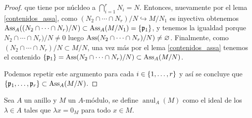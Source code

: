 \documentclass[../main.tex]{subfiles}
\begin{document}
\begin{proof}
que tiene por núcldeo a $\bigcap_{i=1}^r N_i = N$. Entonces, nuevamente por el lema \ref{contenidos_assa}, como $(N_2\cap\cdots\cap N_r)/N\hookrightarrow M/{N_1}$ es inyectiva obtenemos $\text{Ass}_A((N_2\cap\cdots\cap N_r)/N) \subset \text{Ass}_A(M/N_1) = \{\mathfrak{p}_1\}$, y tenemos la igualdad porque $N_2\cap\cdots\cap N_r)/N \neq 0$ luego $\text{Ass}(N_2\cap\cdots\cap N_r)/N) \neq \varnothing$.
Finalmente, como $(N_2\cap\cdots\cap N_r)/N \subset M/N$, una vez más por el lema \ref{contenidos_assa} tenemos el contenido  $\{\mathfrak{p}_1\}= \text{Ass}(N_2\cap\cdots\cap N_r)/N) \subset\text{Ass}_A(M/N)$.

Podemos repetir este argumento para cada $i\in\{1,\dots,r\}$ y así se concluye que $\{\mathfrak{p}_1,\dots,\mathfrak{p}_r\}\subset\text{Ass}_A(M/N)$.
\end{proof}

\begin{definition}
    Sea $A$ un anillo y $M$ un $A$-módulo, se define $\operatorname{anul}_A(M)$ como el ideal de los $\lambda\in A$ tales que $\lambda x=0_M$ para todo $x\in M$.
\end{definition}
\end{document}
